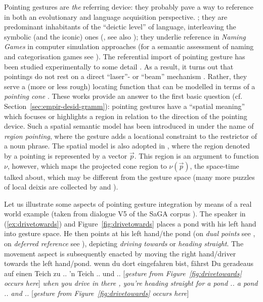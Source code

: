 \documentclass[output=paper]{langsci/langscibook}
\begin{document}
 
Pointing gestures are \emph{the} referring device:
%
they probably pave a way to reference in both an evolutionary and language acquisition perspective. \citep{Bruner:1998,Masataka:2003,Matthews:Behne:Lieven:Tomasello:2012};
%
they are predominant inhabitants of the \enquote{deictic level} of language, interleaving the symbolic (and the iconic) ones (\citet{Levinson:2008}, see also \citet{Buehler:1934:ORIG});
%
they underlie reference in \textit{Naming Games} in computer simulation approaches \citep{Steels:1995} (for a semantic assessment of naming and categorisation games see \citet{Luecking:Mehler:2012}).  
%
The referential import of pointing gesture has been studied experimentally to some detail \citep{Bangerter:Oppenheimer:2006,Kranstedt:Luecking:Pfeiffer:Rieser:Wachsmuth:2006:a,van:der:Sluis:Krahmer:2007}. 
%
As a result, it turns out that pointings do not rest on a direct \enquote{laser}- or \enquote{beam} mechanism \citep{McGinn:1981}.
%
Rather, they serve a (more or less rough) locating function \citep{Clark:1996} that can be modelled in terms of a \emph{pointing cone} \citep{Luecking:Pfeiffer:Rieser:2015}. 
%
These works provide an answer to the first basic question (cf. Section~\ref{sec:empir-desid-gramm}): pointing gestures have a \enquote{spatial meaning} which focuses or highlights a region in relation to the direction of the pointing device.
%
Such a spatial semantic model has been introduced in \citet{Rieser:2004} under the name of \emph{region pointing}, where the gesture adds a locational constraint to the restrictor of a noun phrase.
%
The spatial model is also adopted in \citet{Lascarides:Stone:2009:a}, where the region denoted by a pointing is represented by a vector $\vec{p}$.
%
This region is an argument to function $\nu$, however, which maps the projected cone region to $\nu(\vec{p})$, the space-time talked about, which may be different from the gesture space (many more puzzles of local deixis are collected by \citet{Klein:1978} and \citet{Fricke:2007:a}).


Let us illustrate some aspects of pointing gesture integration by means of a real world example (taken from dialogue V5 of the SaGA corpus \citep{Luecking:Bergmann:Hahn:Kopp:Rieser:2010}).
%
The speaker in (\ref{ex:drivetowards}) and Figure~\ref{fig:drivetowards} places a pond with his left hand into gesture space.
%
He then points at his left hand/the pond (on \emph{dual points} see \citet{Goodwin:2003}, on \emph{deferred reference} see \citet{Quine:1950,Nunberg:1993}), depicting \textit{driving towards} or \textit{heading straight}.
%
The movement aspect is subsequently enacted by moving the right hand/driver towards the left hand/pond.
%
\ea \label{ex:drivetowards}
\glt wenn du dort eingefahren bist, fährst Du geradeaus auf einen Teich zu .. 'n Teich .. und .. [\textit{gesture from Figure~\ref{fig:drivetowards} occurs here}] 
\glt \textit{when you drive in there , you're heading straight for a pond .. a pond .. and .. } [\textit{gesture from Figure~\ref{fig:drivetowards} occurs here}] 
\z 
\end{document}
